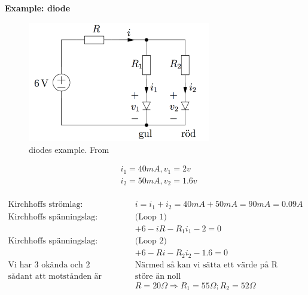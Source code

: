\newpage
\textbf{Example: diode}
\begin{figure}[h]
    \centering
    \includegraphics[width=8cm]{image/example-diode.png}
    \caption{diodes example. From \cite{}}
\end{figure}

\begin{align*}
    &i_1 = 40mA, v_1 = 2v \\
    &i_2 = 50mA, v_2 = 1.6v \\
\end{align*}

\begin{align*}
    \text{Kirchhoffs strömlag: }& i=i_1+i_2=40mA+50mA=90mA=0.09A \\
    \text{Kirchhoffs spänningslag: }& \text{(Loop 1)} \\
    &+6-iR-R_1i_1-2=0 \\
    \text{Kirchhoffs spänningslag: }& \text{(Loop 2)} \\
    &+6-Ri-R_2i_2-1.6=0 \\
    \text{Vi har 3 okända och 2 eqvationer.}
    &\text{Närmed så kan vi sätta ett värde på R} \\
    \text{sådant att motstånden är} &\text{störe än noll} \\
    &R=20\Omega \Rightarrow R_1 = 55\Omega; R_2 = 52\Omega \\
\end{align*}



\newpage
